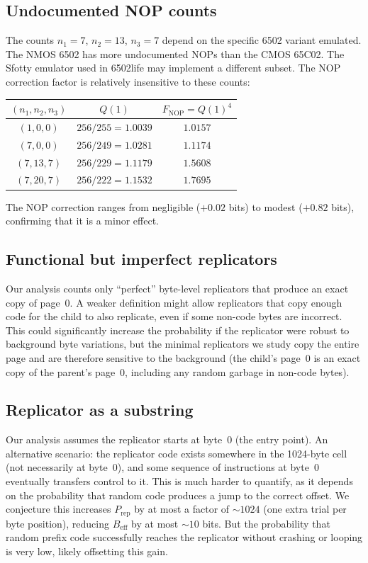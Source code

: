\documentclass{article}
\newcommand{\Beff}{B_{\mathrm{eff}}}
\newcommand{\Prep}{P_{\mathrm{rep}}}
\begin{document}
\subsection{Undocumented NOP counts}

The counts $n_1 = 7$, $n_2 = 13$, $n_3 = 7$ depend on the specific
6502 variant emulated. The NMOS 6502 has more undocumented NOPs than
the CMOS 65C02. The Sfotty emulator used in 6502life may implement
a different subset. The NOP correction factor is relatively insensitive
to these counts:

\begin{center}
\begin{tabular}{ccc}
\toprule
$(n_1, n_2, n_3)$ & $Q(1)$ & $F_{\mathrm{NOP}} = Q(1)^4$ \\
\midrule
$(1, 0, 0)$ & $256/255 = 1.0039$ & $1.0157$ \\
$(7, 0, 0)$ & $256/249 = 1.0281$ & $1.1174$ \\
$(7, 13, 7)$ & $256/229 = 1.1179$ & $1.5608$ \\
$(7, 20, 7)$ & $256/222 = 1.1532$ & $1.7695$ \\
\bottomrule
\end{tabular}
\end{center}

The NOP correction ranges from negligible ($+0.02$ bits) to modest
($+0.82$ bits), confirming that it is a minor effect.

\subsection{Functional but imperfect replicators}

Our analysis counts only ``perfect'' byte-level replicators that
produce an exact copy of page~0. A weaker definition might allow
replicators that copy enough code for the child to also replicate,
even if some non-code bytes are incorrect. This could significantly
increase the probability if the replicator were robust to background
byte variations, but the minimal replicators we study copy the entire
page and are therefore sensitive to the background (the child's page~0
is an exact copy of the parent's page~0, including any random garbage
in non-code bytes).

\subsection{Replicator as a substring}

Our analysis assumes the replicator starts at byte~0 (the entry point).
An alternative scenario: the replicator code exists somewhere in the
1024-byte cell (not necessarily at byte~0), and some sequence of
instructions at byte~0 eventually transfers control to it. This is
much harder to quantify, as it depends on the probability that random
code produces a jump to the correct offset. We conjecture this
increases $\Prep$ by at most a factor of $\sim 1024$ (one extra trial
per byte position), reducing $\Beff$ by at most $\sim 10$ bits. But
the probability that random prefix code successfully reaches the
replicator without crashing or looping is very low, likely offsetting
this gain.
\end{document}
